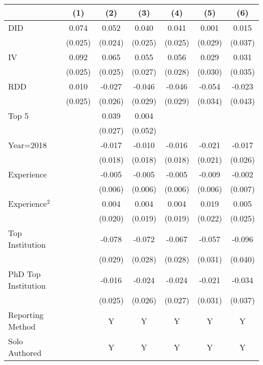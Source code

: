 \begin{tabular}{l*{6}{c}}
\hline\hline
                &\multicolumn{1}{c}{(1)}&\multicolumn{1}{c}{(2)}&\multicolumn{1}{c}{(3)}&\multicolumn{1}{c}{(4)}&\multicolumn{1}{c}{(5)}&\multicolumn{1}{c}{(6)}\\
\hline
DID             &    0.074&    0.052&    0.040&    0.041&    0.001&    0.015\\
                &  (0.025)&  (0.024)&  (0.025)&  (0.025)&  (0.029)&  (0.037)\\
IV              &    0.092&    0.065&    0.055&    0.056&    0.029&    0.031\\
                &  (0.025)&  (0.025)&  (0.027)&  (0.028)&  (0.030)&  (0.035)\\
RDD             &    0.010&   -0.027&   -0.046&   -0.046&   -0.054&   -0.023\\
                &  (0.025)&  (0.026)&  (0.029)&  (0.029)&  (0.034)&  (0.043)\\
Top 5           &         &    0.039&    0.004&         &         &         \\
                &         &  (0.027)&  (0.052)&         &         &         \\
Year=2018       &         &   -0.017&   -0.010&   -0.016&   -0.021&   -0.017\\
                &         &  (0.018)&  (0.018)&  (0.018)&  (0.021)&  (0.026)\\
Experience      &         &   -0.005&   -0.005&   -0.005&   -0.009&   -0.002\\
                &         &  (0.006)&  (0.006)&  (0.006)&  (0.006)&  (0.007)\\
Experience$^2$  &         &    0.004&    0.004&    0.004&    0.019&    0.005\\
                &         &  (0.020)&  (0.019)&  (0.019)&  (0.022)&  (0.025)\\
Top Institution &         &   -0.078&   -0.072&   -0.067&   -0.057&   -0.096\\
                &         &  (0.029)&  (0.028)&  (0.028)&  (0.031)&  (0.040)\\
PhD Top Institution&         &   -0.016&   -0.024&   -0.024&   -0.021&   -0.034\\
                &         &  (0.025)&  (0.026)&  (0.027)&  (0.031)&  (0.037)\\
Reporting Method &         &        Y&        Y&        Y&        Y&        Y\\
Solo Authored   &         &        Y&        Y&        Y&        Y&        Y\\

\end{tabular}
